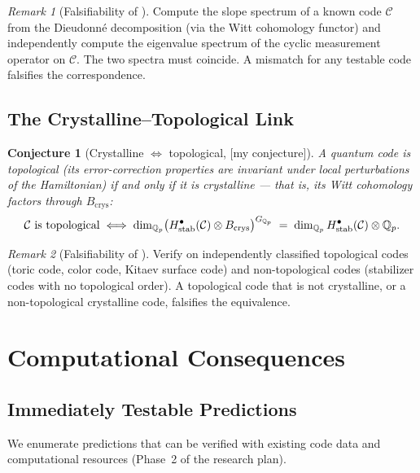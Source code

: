 \documentclass[12pt]{article}
\theoremstyle{definition}
\theoremstyle{plain}
\newtheorem{conjecture}{Conjecture}[section]
\theoremstyle{remark}
\newtheorem{remark}{Remark}[section]
\newcommand{\myconj}{{\color{orange}[\textsf{my conjecture}]}}
\newcommand{\Qp}{\mathbb{Q}_p}
\newcommand{\cC}{\mathcal{C}}
\newcommand{\Bcrys}{B_{\mathrm{crys}}}
\begin{document}
\begin{remark}[Falsifiability of ]
Compute the slope spectrum of a known code $\cC$ from the Dieudonn\'{e} decomposition (via the Witt cohomology functor) and independently compute the eigenvalue spectrum of the cyclic measurement operator on $\cC$. The two spectra must coincide. A mismatch for any testable code falsifies the correspondence.
\end{remark}

\subsection{The Crystalline--Topological Link}

\begin{conjecture}[Crystalline $\Longleftrightarrow$ topological, \myconj]\label{conj:crystalline-topological}
A quantum code is \emph{topological} (its error-correction properties are invariant under local perturbations of the Hamiltonian) if and only if it is crystalline — that is, its Witt cohomology factors through $\Bcrys$:
\[
\cC\text{ is topological}\;\Longleftrightarrow\;
\dim_{\Qp}\bigl(H^{\bullet}_{\textup{stab}}(\cC)\otimes\Bcrys\bigr)^{G_{\Qp}}
\;=\;\dim_{\Qp}H^{\bullet}_{\textup{stab}}(\cC)\otimes\Qp.
\]
\end{conjecture}

\begin{remark}[Falsifiability of ]
Verify on independently classified topological codes (toric code, color code, Kitaev surface code) and non-topological codes (stabilizer codes with no topological order). A topological code that is not crystalline, or a non-topological crystalline code, falsifies the equivalence.
\end{remark}

\section{Computational Consequences}

\subsection{Immediately Testable Predictions}

We enumerate predictions that can be verified with existing code data and computational resources (Phase~2 of the research plan).
\end{document}
